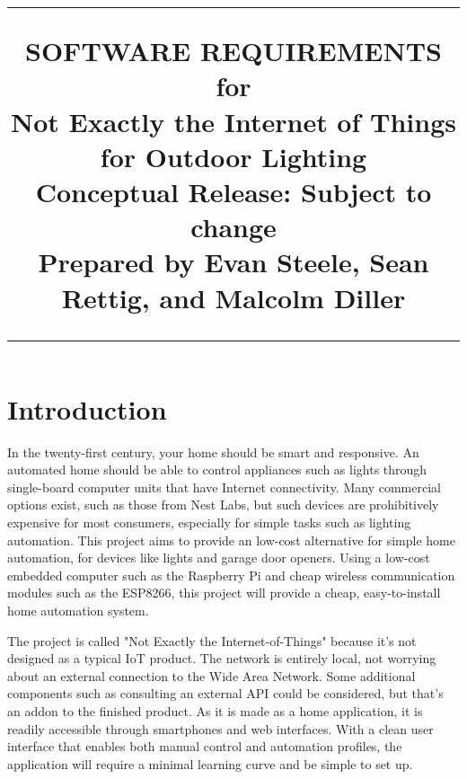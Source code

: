 \documentclass[oneside,openright]{scrreprt}
\title{
	\flushright
		\rule{16cm}{5pt}\vskip1cm
		\Huge{SOFTWARE REQUIREMENTS}\\
		\vspace{2cm}
	for\\
		\vspace{2cm}
	Not Exactly the Internet of Things for Outdoor Lighting\\
		\vspace{2cm}
	\LARGE{Conceptual Release:}
	\vspace{2cm}
	\LARGE{Subject to change\\}
	\vspace{2cm}
	Prepared by Evan Steele, Sean Rettig, and Malcolm Diller\\
		\vfill
		\rule{16cm}{5pt}
}
\date{}
\begin{document}
\maketitle
\tableofcontents
\newpage

\section{Introduction}

In the twenty-first century, your home should be smart and responsive. An
automated home should be able to control appliances such as lights through
single-board computer units that have Internet connectivity. Many commercial
options exist, such as those from Nest Labs, but such devices are prohibitively
expensive for most consumers, especially for simple tasks such as lighting
automation. This project aims to provide an low-cost alternative for simple
home automation, for devices like lights and garage door openers. Using a
low-cost embedded computer such as the Raspberry Pi and cheap wireless
communication modules such as the ESP8266, this project will provide a cheap,
easy-to-install home automation system.

The project is called "Not Exactly the Internet-of-Things" because it's not
designed as a typical IoT product. The network is entirely local, not worrying
about an external connection to the Wide Area Network. Some additional
components such as consulting an external API could be considered, but that's
an addon to the finished product. As it is made as a home application, it
is readily accessible through smartphones and web interfaces. With a clean user
interface that enables both manual control and automation profiles, the
application will require a minimal learning curve and be simple to set up.  
\end{document}
